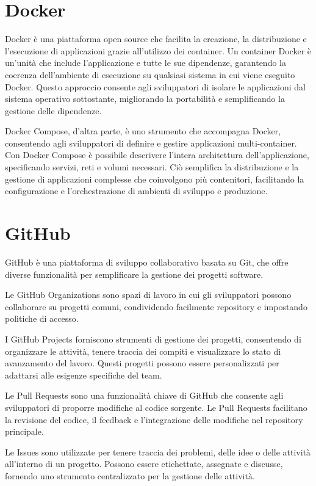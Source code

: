 \section{Docker}

Docker è una piattaforma open source che facilita la creazione, la distribuzione e l'esecuzione di applicazioni grazie all'utilizzo dei container. Un container Docker è un'unità che include l'applicazione e tutte le sue dipendenze, garantendo la coerenza dell'ambiente di esecuzione su qualsiasi sistema in cui viene eseguito Docker. Questo approccio consente agli sviluppatori di isolare le applicazioni dal sistema operativo sottostante, migliorando la portabilità e semplificando la gestione delle dipendenze.

Docker Compose, d'altra parte, è uno strumento che accompagna Docker, consentendo agli sviluppatori di definire e gestire applicazioni multi-container. Con Docker Compose è possibile descrivere l'intera architettura dell'applicazione, specificando servizi, reti e volumi necessari. Ciò semplifica la distribuzione e la gestione di applicazioni complesse che coinvolgono più contenitori, facilitando la configurazione e l'orchestrazione di ambienti di sviluppo e produzione.

\section{GitHub}

GitHub è una piattaforma di sviluppo collaborativo basata su Git, che offre diverse funzionalità per semplificare la gestione dei progetti software.

Le GitHub Organizations sono spazi di lavoro in cui gli sviluppatori possono collaborare su progetti comuni, condividendo facilmente repository e impostando politiche di accesso.

I GitHub Projects forniscono strumenti di gestione dei progetti, consentendo di organizzare le attività, tenere traccia dei compiti e visualizzare lo stato di avanzamento del lavoro. Questi progetti possono essere personalizzati per adattarsi alle esigenze specifiche del team.

Le Pull Requests sono una funzionalità chiave di GitHub che consente agli sviluppatori di proporre modifiche al codice sorgente. Le Pull Requests facilitano la revisione del codice, il feedback e l'integrazione delle modifiche nel repository principale.

Le Issues sono utilizzate per tenere traccia dei problemi, delle idee o delle attività all'interno di un progetto. Possono essere etichettate, assegnate e discusse, fornendo uno strumento centralizzato per la gestione delle attività.

